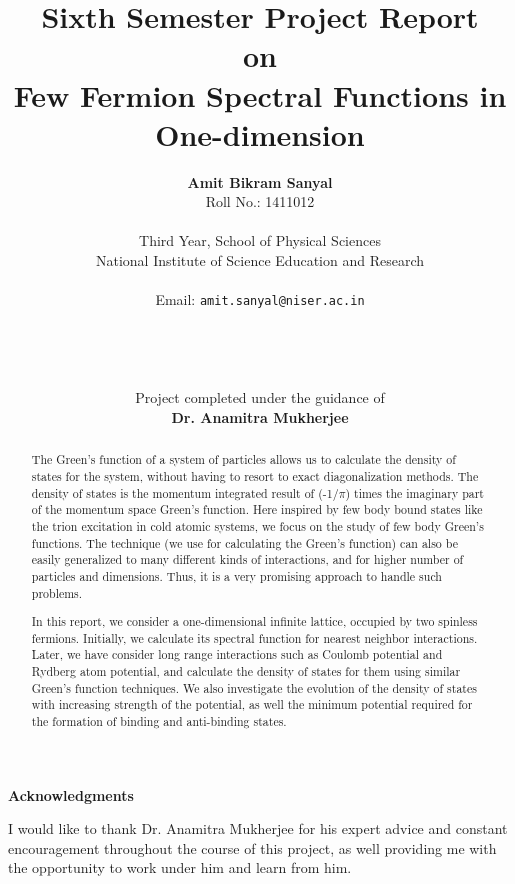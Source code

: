 \documentclass[a4paper, 11pt]{report}
\title{\textbf{{\large Sixth Semester Project Report\\on}\vspace{3mm}\\Few Fermion Spectral Functions in One-dimension}}
\author{\textbf{Amit Bikram Sanyal}\\
	Roll No.: 1411012\\\\
	Third Year, School of Physical Sciences\\
	National Institute of Science Education and Research\\ \\
	Email: \texttt{amit.sanyal@niser.ac.in}\\ \\ \\ \\ \\
	Project completed under the guidance of\\
	\textbf{Dr. Anamitra Mukherjee}
}
\date{}
\begin{document}
\begin{titlepage}
	\maketitle
	\thispagestyle{empty}
\end{titlepage}
\newpage
\thispagestyle{empty}

\begin{center}
	{\Large \textbf{Acknowledgments}}
\end{center}
I would like to thank Dr. Anamitra Mukherjee for his expert advice and constant encouragement throughout the course of this project, as well providing me with the opportunity to work under him and learn from him.
\thispagestyle{empty}
\newpage
\thispagestyle{empty}

\begin{abstract}
The Green's function of a system of particles allows us to calculate the density of states for the system, without having to resort to exact diagonalization methods. The density of states is the momentum integrated result of (-1/$\pi$) times the imaginary part of the momentum space Green's function. Here inspired by few body bound states like the trion excitation in cold atomic systems, we focus on the study of few body Green's functions. The technique (we use for calculating the Green's function) can also be easily generalized to many different kinds of interactions, and for higher number of particles and dimensions. Thus, it is a very promising approach to handle such problems.

In this report, we consider a one-dimensional infinite lattice, occupied by two spinless fermions. Initially, we calculate its spectral function for nearest neighbor interactions. Later, we have consider long range interactions such as Coulomb potential and Rydberg atom potential, and calculate the density of states for them using similar Green's function techniques. We also investigate the evolution of the density of states with increasing strength of the potential, as well the minimum potential required for the formation of binding and anti-binding states.
\thispagestyle{empty}
\end{abstract}

\thispagestyle{empty}
\pagebreak
\thispagestyle{empty}
\tableofcontents
\thispagestyle{empty}
\end{document}
